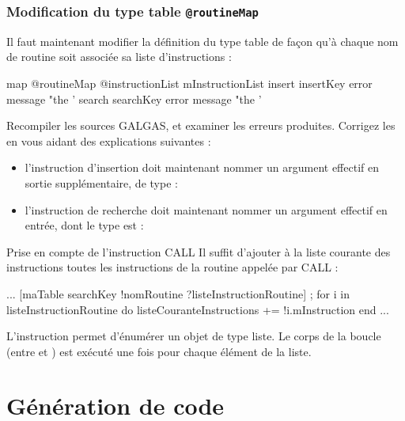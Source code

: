 \subsubsection{Modification du type table \texttt{@routineMap}}
Il faut maintenant modifier la définition du type table  de façon qu'à chaque nom de routine soit associée sa liste d'instructions :

\begin{galgascode}
map @routineMap {
  @instructionList mInstructionList
  insert insertKey  error message "the '%
  search searchKey error message "the '%
}
\end{galgascode}

Recompiler les sources GALGAS, et examiner les erreurs produites. Corrigez les en vous aidant des explications suivantes :
\begin{itemize}
  \item l'instruction d'insertion doit maintenant nommer un argument effectif en sortie supplémentaire, de type  :
  \begin{description}
    \item[ ] 
  \end{description}
  \item l'instruction de recherche doit maintenant nommer un argument effectif en entrée, dont le type est  :
  \begin{description}
    \item[ ] 
  \end{description}
\end{itemize}

Prise en compte de l'instruction CALL
Il suffit d'ajouter à la liste courante des instructions toutes les instructions de la routine appelée par CALL :
\begin{galgascode}
...
[maTable searchKey !nomRoutine ?listeInstructionRoutine] ;
for i in listeInstructionRoutine do
  listeCouranteInstructions += !i.mInstruction
end
...
\end{galgascode}

L'instruction  permet d’énumérer un objet de type liste. Le corps de la boucle (entre  et ) est exécuté une fois pour chaque élément  de la liste.

\section{Génération de code}

